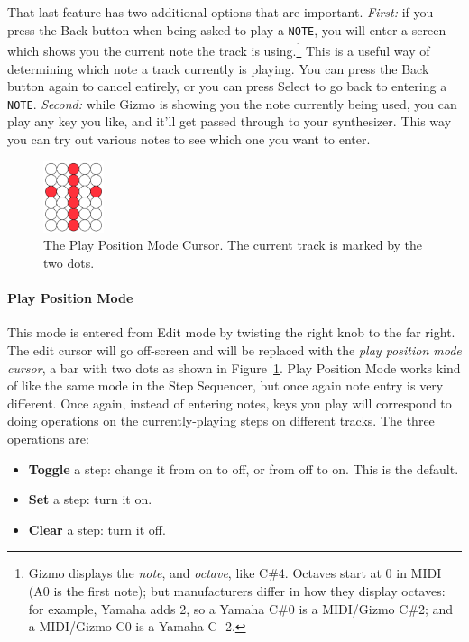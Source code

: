 \documentclass{article}
\begin{document}
That last feature has two additional options that are important.  {\it First:} if you press the Back button when being asked to play a {\tt NOTE},  you will enter a screen which shows you the current note the track is using.\footnote{Gizmo displays the {\it note}, and {\it octave}, like C\#4.  Octaves start at 0 in MIDI (A0 is the first note); but manufacturers differ in how they display octaves: for example, Yamaha adds 2, so a Yamaha C\#0 is a MIDI/Gizmo C\#2; and a MIDI/Gizmo C0 is a Yamaha C -2.}  This is a useful way of determining which note a track currently is playing.  You can press the Back button again to cancel entirely, or you can press Select to go back to entering a {\tt NOTE}.  {\it Second:} while Gizmo is showing you the note currently being used, you can play any key you like, and it'll get passed through to your synthesizer.  This way you can try out various notes to see which one you want to enter.

\begin{figure}
\vspace{-1em}
\hspace{\fill}\includegraphics[width=0.7in]{playpositionmode}\hspace{\fill}
\caption{\small The Play Position Mode Cursor.  The current track is marked by the two dots.}
\vspace{-2em}
\label{playpositionmode2}
\end{figure}



\paragraph{Play Position Mode}  This mode is entered from Edit mode by twisting the right knob to the far right.  The edit cursor will go off-screen and will be replaced with the {\it play position mode cursor}, a bar with two dots as shown in Figure~\ref{playpositionmode2}.  Play Position Mode works kind of like the same mode in the Step Sequencer, but once again note entry is very different.   Once again, instead of entering notes, keys you play will correspond to doing operations on the currently-playing steps on different tracks. The three operations are:

\begin{itemize}
\item {\bf Toggle} a step: change it from on to off, or from off to on.  This is the default.
\item {\bf Set} a step: turn it on.
\item {\bf Clear} a step: turn it off.
\end{itemize}
\end{document}
